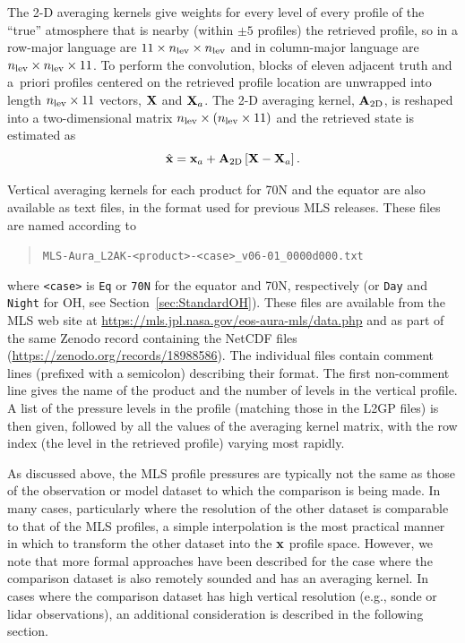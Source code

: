 The \mbox{2-D} averaging kernels give weights for every level of every profile of the ``true'' atmosphere that is nearby (within $\pm5$ profiles) the retrieved profile, so in a row-major language are $11 \times n_{\text{lev}} \times n_{\text{lev}}$ and in column-major language are $n_{\text{lev}} \times n_{\text{lev}} \times 11$. To perform the convolution, blocks of eleven adjacent truth and a~priori profiles centered on the retrieved profile location are unwrapped into length $n_{\text{lev}} \times 11$ vectors, $\mathbf{X}$ and $\mathbf{X}_a$. The \mbox{2-D} averaging kernel, $\mathbf{A}_{\text{2D}}$, is reshaped into a two-dimensional matrix $n_{\text{lev}} \times \left(n_{\text{lev}} \times 11\right)$ and the retrieved state is estimated as
\begin{equation}
  \hat{\mathbf{x}} = \mathbf{x}_a + \mathbf{A}_{\text{2D}}\left[\mathbf{X}-\mathbf{X}_a\right].
  \label{eqn:AVKApplication2D}
\end{equation}

Vertical averaging kernels for each product for 70\degsym{}N and the equator are also available as text files, in the format used for previous MLS releases. These files are named according to
\begin{quote}
  \verb+MLS-Aura_L2AK-<product>-<case>_v06-01_0000d000.txt+
\end{quote}
where \verb+<case>+ is \verb+Eq+ or \verb+70N+ for the equator and 70\degsym{}N, respectively (or \verb+Day+ and \verb+Night+ for OH, see Section~\ref{sec:StandardOH}).  These files are available from the MLS web site at \url{https://mls.jpl.nasa.gov/eos-aura-mls/data.php} and as part of the same Zenodo record containing the NetCDF files (\url{https://zenodo.org/records/18988586}).  The individual files contain comment lines (prefixed with a semicolon) describing their format. The first non-comment line gives the name of the product and the number of levels in the vertical profile. A list of the pressure levels in the profile (matching those in the L2GP files) is then given, followed by all the values of the averaging kernel matrix, with the row index (the level in the retrieved profile) varying most rapidly.

As discussed above, the MLS profile pressures are typically not the same as those of the observation or model dataset to which the comparison is being made. In many cases, particularly where the resolution of the other dataset is comparable to that of the MLS profiles, a simple interpolation is the most practical manner in which to transform the other dataset into the $\mathbf{x}$ profile space. However, we note that more formal approaches have been described \citep{RodgersAndConnor:2003} for the case where the comparison dataset is also remotely sounded and has an averaging kernel. In cases where the comparison dataset has high vertical resolution (e.g., sonde or lidar observations), an additional consideration is described in the following section.

